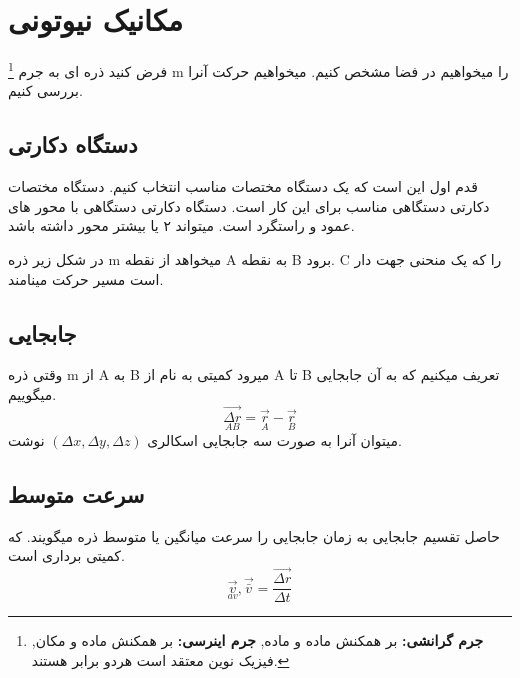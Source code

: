\documentclass[12px, a4paper, oneside]{article}
\begin{document}
\section*{مکانیک نیوتونی}
\newcommand\deltavec[1]{\vec{\Delta{#1}}}
\newcommand\undersetrtl[2]{${\underset{#1}{#2}}$}
فرض کنید ذره ای به جرم
\footnote[1]{
    {\bf جرم گرانشی:}
    بر همکنش ماده و ماده,
    {\bf جرم اینرسی:}
    بر همکنش ماده و مکان, فیزیک نوین معتقد است هردو برابر هستند.
}
 m را میخواهیم در فضا مشخص کنیم.  میخواهیم حرکت آنرا بررسی کنیم. 
\subsection*{دستگاه دکارتی}
قدم اول این است که یک دستگاه مختصات مناسب انتخاب کنیم. دستگاه مختصات دکارتی دستگاهی مناسب برای این کار است.
دستگاه دکارتی دستگاهی با محور های عمود و راستگرد است. میتواند ۲ یا بیشتر محور داشته باشد.

در شکل زیر ذره m میخواهد از نقطه A به نقطه B برود. 
C را که یک منحنی جهت دار است مسیر حرکت مینامند.

\subsection*{جابجایی}
وقتی ذره m از A به B میرود کمیتی به نام از A تا B تعریف میکنیم که به آن جابجایی میگوییم.
\[ \underset{AB}{\deltavec{r}} = \vec{\underset{A}{r}} - \vec{\underset{B}{r}} \]
میتوان آنرا به صورت سه جابجایی اسکالری $
(\Delta{x},\Delta{y},\Delta{z}) $
نوشت.
\subsection*{سرعت متوسط}
حاصل تقسیم جابجایی به زمان جابجایی را سرعت میانگین یا متوسط ذره میگویند. که کمیتی برداری است.
\[ \vec{\underset{av}{v}} , \vec{\bar{v}} = \frac{\deltavec{r}}{\Delta{t}}\]
\end{document}
